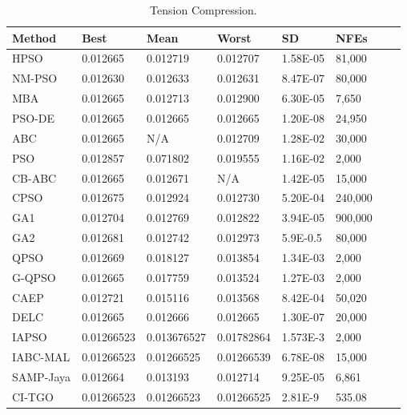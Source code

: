 
\begin{table*}[tp]
    \tiny
\begin{center}

\begin{tabular}{ P{2.0cm} P{2.0cm} P{2.0cm} P{2.0cm} P{2.0cm} P{2.0cm} P{2.0cm} P{2.0cm}  }
\hline
\textbf{Method} & \textbf{Best} & \textbf{Mean} & \textbf{Worst} & \textbf{SD} & \textbf{NFEs} \\
\hline

HPSO & 0.012665 & 0.012719 & 0.012707 & 1.58E-05 & 81,000 \\
NM-PSO & 0.012630 & 0.012633 & 0.012631 & 8.47E-07 & 80,000 \\
MBA & 0.012665 & 0.012713 & 0.012900 & 6.30E-05 & 7,650 \\
PSO-DE & 0.012665 & 0.012665 & 0.012665 & 1.20E-08 & 24,950 \\
ABC & 0.012665 & N/A & 0.012709 & 1.28E-02 & 30,000 \\
PSO & 0.012857 & 0.071802 & 0.019555 & 1.16E-02 & 2,000 \\
CB-ABC & 0.012665 & 0.012671 & N/A & 1.42E-05 & 15,000 \\
CPSO & 0.012675 & 0.012924 & 0.012730 & 5.20E-04 & 240,000 \\
GA1 & 0.012704 & 0.012769 & 0.012822 & 3.94E-05 & 900,000 \\
GA2 & 0.012681 & 0.012742 & 0.012973 & 5.9E-0.5 & 80,000 \\
QPSO & 0.012669 & 0.018127 & 0.013854 & 1.34E-03 & 2,000 \\
G-QPSO & 0.012665 & 0.017759 & 0.013524 & 1.27E-03 & 2,000 \\
CAEP & 0.012721 & 0.015116 & 0.013568 & 8.42E-04 & 50,020 \\
DELC & 0.012665 & 0.012666 & 0.012665 & 1.30E-07 & 20,000 \\
IAPSO & 0.01266523 & 0.013676527 & 0.01782864 & 1.573E-3 & 2,000 \\
IABC-MAL & 0.01266523 & 0.01266525 & 0.01266539 & 6.78E-08 & 15,000 \\
SAMP-Jaya & 0.012664 & 0.013193 & 0.012714 & 9.25E-05 & 6,861 \\
CI-TGO & 0.01266523 & 0.01266523 & 0.01266525 & 2.81E-9 & 535.08 \\

\hline
\end{tabular}
\end{center}

\caption{ Tension Compression. \\[1em]}
\label{tab:TC}
\end{table*}

